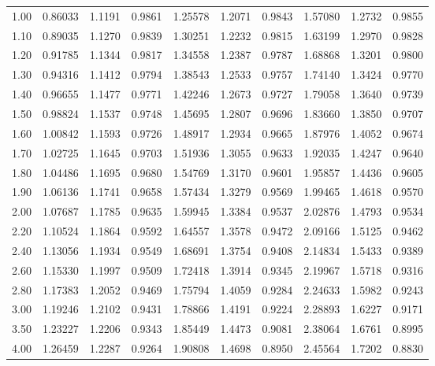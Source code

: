 {\begin{longtable}{|||j{3.2}|X|X|X|||}
%
1.00   & 0.86033  & 1.1191  & 0.9861  & 1.25578   & 1.2071  & 0.9843  & 1.57080  & 1.2732  & 0.9855 \\* 
1.10   & 0.89035  & 1.1270  & 0.9839  & 1.30251   & 1.2232  & 0.9815  & 1.63199  & 1.2970  & 0.9828 \\  
1.20   & 0.91785  & 1.1344  & 0.9817  & 1.34558   & 1.2387  & 0.9787  & 1.68868  & 1.3201  & 0.9800 \\ 
1.30   & 0.94316  & 1.1412  & 0.9794  & 1.38543   & 1.2533  & 0.9757  & 1.74140  & 1.3424  & 0.9770 \\  
1.40   & 0.96655  & 1.1477  & 0.9771  & 1.42246   & 1.2673  & 0.9727  & 1.79058  & 1.3640  & 0.9739 \\  
1.50   & 0.98824  & 1.1537  & 0.9748  & 1.45695   & 1.2807  & 0.9696  & 1.83660  & 1.3850  & 0.9707 \\ 
1.60   & 1.00842  & 1.1593  & 0.9726  & 1.48917   & 1.2934  & 0.9665  & 1.87976  & 1.4052  & 0.9674 \\  
1.70   & 1.02725  & 1.1645  & 0.9703  & 1.51936   & 1.3055  & 0.9633  & 1.92035  & 1.4247  & 0.9640 \\* 
1.80   & 1.04486  & 1.1695  & 0.9680  & 1.54769   & 1.3170  & 0.9601  & 1.95857  & 1.4436  & 0.9605 \\*  
1.90   & 1.06136  & 1.1741  & 0.9658  & 1.57434   & 1.3279  & 0.9569  & 1.99465  & 1.4618  & 0.9570 \\[6pt]  
%
2.00   & 1.07687  & 1.1785  & 0.9635  & 1.59945   & 1.3384  & 0.9537  & 2.02876  & 1.4793  & 0.9534 \\*  
2.20   & 1.10524  & 1.1864  & 0.9592  & 1.64557   & 1.3578  & 0.9472  & 2.09166  & 1.5125  & 0.9462 \\  
2.40   & 1.13056  & 1.1934  & 0.9549  & 1.68691   & 1.3754  & 0.9408  & 2.14834  & 1.5433  & 0.9389 \\  
2.60   & 1.15330  & 1.1997  & 0.9509  & 1.72418   & 1.3914  & 0.9345  & 2.19967  & 1.5718  & 0.9316 \\  
2.80   & 1.17383  & 1.2052  & 0.9469  & 1.75794   & 1.4059  & 0.9284  & 2.24633  & 1.5982  & 0.9243 \\ 
3.00   & 1.19246  & 1.2102  & 0.9431  & 1.78866   & 1.4191  & 0.9224  & 2.28893  & 1.6227  & 0.9171 \\     
3.50   & 1.23227  & 1.2206  & 0.9343  & 1.85449   & 1.4473  & 0.9081  & 2.38064  & 1.6761  & 0.8995 \\     
4.00   & 1.26459  & 1.2287  & 0.9264  & 1.90808   & 1.4698  & 0.8950  & 2.45564  & 1.7202  & 0.8830 \\*   

\end{longtable}}
